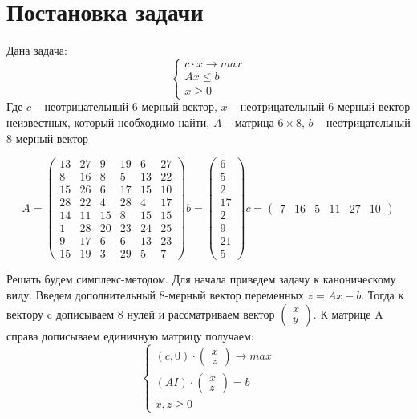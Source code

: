 \documentclass[a4paper, 14pt]{extarticle}
\newenvironment{widerequation}{%
	\begin{adjustwidth}{-2cm}{-2cm}\[}
		{\]\end{adjustwidth}}
\begin{document}
	\pagebreak	
	
	\section{Постановка задачи}
		Дана задача:
			\[\begin{cases}
				c \cdot x \rightarrow max\\
				Ax \leq b\\
				x \geq 0
			\end{cases}\]
		Где $c$ -- неотрицательный 6-мерный вектор, $x$ -- неотрицательный
		6-мерный вектор неизвестных, который необходимо найти, $A$ -- матрица $6 \times 8$, $b$ -- неотрицательный 8-мерный вектор
		
		\begin{widerequation}
			A = \begin{pmatrix}
					13 & 27 & 9  & 19 & 6  & 27\\
					8  & 16 & 8  & 5  & 13 & 22\\
					15 & 26 & 6  & 17 & 15 & 10\\
					28 & 22 & 4  & 28 & 4  & 17\\
					14 & 11 & 15 & 8  & 15 & 15\\
					1  & 28 & 20 & 23 & 24 & 25\\
					9  & 17 & 6  & 6  & 13 & 23\\
					15 & 19 & 3  & 29 & 5 & 7
				\end{pmatrix}
			b = \begin{pmatrix}
					6 \\ 5 \\ 2 \\17 \\ 2 \\ 9 \\ 21 \\ 5
				\end{pmatrix}	
			c = \begin{pmatrix}
					7 & 16 & 5 & 11 & 27 & 10
				\end{pmatrix}	 
		\end{widerequation}
	
		Решать будем симплекс-методом. Для начала приведем задачу к
		каноническому виду. Введем дополнительный 8-мерный вектор переменных $z = Ax - b$.
		Тогда к вектору c дописываем 8 нулей и рассматриваем вектор $\begin{pmatrix}x \\ y \end{pmatrix}$. 
		К матрице A справа дописываем единичную матрицу получаем:
		\[
			\begin{cases}
				(c, 0) \cdot \begin{pmatrix} x \\ z \end{pmatrix} \rightarrow max \\
				(AI) \cdot \begin{pmatrix} x \\ z \end{pmatrix} = b\\
				x, z \geq 0
			\end{cases}  
		\]
		\pagebreak
		
\end{document}
